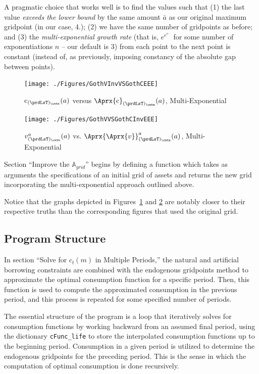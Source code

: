 \documentclass[titlepage, headings=optiontotocandhead]{econtex}
\begin{document}
A pragmatic choice that works well is to find the values such that (1) the last value \textit{exceeds the lower bound} by the same amount $\bar a$ as our original maximum gridpoint (in our case, 4.); (2) we have the same number of gridpoints as before; and (3) the \textit{multi-exponential growth rate} (that is, $e^{e^{e^{...}}}$ for some number of exponentiations $n$ -- our default is 3) from each point to the next point is constant (instead of, as previously, imposing constancy of the absolute gap between points).

\hypertarget{GothVInvVSGothCEEE}{}
\begin{figure}
  \centerline{\texttt{[image: ./Figures/GothVInvVSGothCEEE]}}
  \caption{$\mathrm{c}_{(\prdLsT)_\cntn}(a)$ versus
    $\Aprx{\mathrm{c}}_{(\prdLsT)_\cntn}(a)$, Multi-Exponential }
  \label{fig:GothVInvVSGothCEE}
\end{figure}


\hypertarget{GothVVSGothCInvEEE}{}
\begin{figure}
  \texttt{[image: ./Figures/GothVVSGothCInvEEE]}
  \caption{$v^{a}_{(\prdLsT)_\cntn}(a)$ vs.
    $\Aprx{\Aprx{v}}_{(\prdLsT)_\cntn}^{a}(a)$, Multi-Exponential }
  \label{fig:GothVVSGothCInvEE}
\end{figure}

Section ``Improve the $\mathbb{A}_{grid}$'' begins by defining a function which takes as arguments the specifications of an initial grid of assets and returns the new grid incorporating the multi-exponential approach outlined above.


Notice that the graphs depicted in Figures~\ref{fig:GothVInvVSGothCEE} and \ref{fig:GothVVSGothCInvEE} are notably closer to their respective truths than the corresponding figures that used the original grid.

\subsection{Program Structure}

In section ``Solve for $c_t(m)$ in Multiple Periods,'' the natural and artificial borrowing constraints are combined with the endogenous gridpoints method to approximate the optimal consumption function for a specific period. Then, this function is used to compute the approximated consumption in the previous period, and this process is repeated for some specified number of periods.

The essential structure of the program is a loop that iteratively solves for consumption functions by working backward from an assumed final period, using the dictionary \texttt{cFunc\_life} to store the interpolated consumption functions up to the beginning period. Consumption in a given period is utilized to determine the endogenous gridpoints for the preceding period. This is the sense in which the computation of optimal consumption is done recursively.
\end{document}
